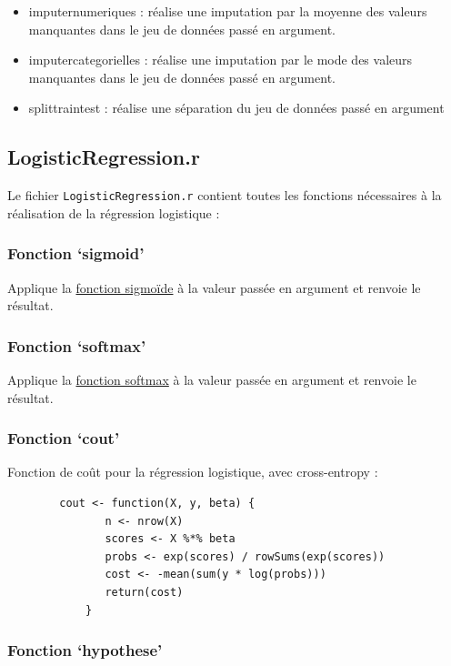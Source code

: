 \documentclass[10pt,french]{report}
\begin{document}
	\begin{itemize}
		\item imputer\textunderscore numeriques : réalise une imputation par la moyenne des valeurs manquantes dans le jeu de données passé en argument.
		\item imputer\textunderscore categorielles : réalise une imputation par le mode des valeurs manquantes dans le jeu de données passé en argument.
		\item split\textunderscore train\textunderscore test : réalise une séparation du jeu de données passé en argument
	\end{itemize}

	\subsection{LogisticRegression.r}

	Le fichier \texttt{LogisticRegression.r} contient toutes les fonctions nécessaires à la réalisation de la régression logistique :

	\subsubsection{Fonction \enquote*{sigmoid}}
	Applique la \hyperref[fonction sigmoïde]{fonction sigmoïde} à la valeur passée en argument et renvoie le résultat.

	\subsubsection{Fonction \enquote*{softmax}}
	Applique la \hyperref[fonction softmax]{fonction softmax} à la valeur passée en argument et renvoie le résultat.

	\subsubsection{Fonction \enquote*{cout}}
	Fonction de coût pour la régression logistique, avec cross-entropy :

	\begin{verbatim}
		cout <- function(X, y, beta) {
			   n <- nrow(X)
			   scores <- X %*% beta
			   probs <- exp(scores) / rowSums(exp(scores))
			   cost <- -mean(sum(y * log(probs)))
			   return(cost)
		    }
	\end{verbatim}

	\subsubsection{Fonction \enquote*{hypothese}}
\end{document}
